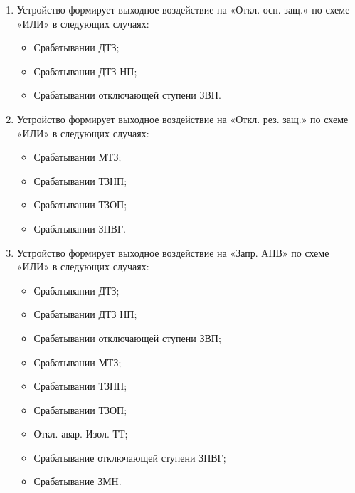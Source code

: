 \color{black}

\begin{enumerate}[label=\arabic{section}.\arabic{subsection}.\arabic{enumi}, labelsep=4pt, leftmargin=0pt, itemindent=57pt, itemsep=0pt, parsep=0pt] %


\item
Устройство формирует выходное воздействие на  «Откл. осн. защ.» по схеме «ИЛИ» в следующих 
случаях: 

\begin{itemize}
    \item Срабатывании ДТЗ;  
    \item Срабатывании ДТЗ НП;
    \item Срабатывании отключающей ступени ЗВП. 
\end{itemize}

\item
Устройство формирует выходное воздействие на  «Откл. рез. защ.» по схеме «ИЛИ» в следующих 
случаях: 

\begin{itemize}
    \item Срабатывании МТЗ; 
    \item Срабатывании ТЗНП; 
    \item Срабатывании ТЗОП;
    \item Срабатывании ЗПВГ.
\end{itemize}

\item
Устройство формирует выходное воздействие на «Запр. АПВ» по схеме «ИЛИ» в следующих 
случаях: 

\begin{itemize}
    \item Срабатывании ДТЗ;
    \item Срабатывании ДТЗ НП; 
    \item Срабатывании отключающей ступени ЗВП;
    \item Срабатывании МТЗ;
    \item Срабатывании ТЗНП;
    \item Срабатывании ТЗОП;
    \item Откл. авар. Изол. ТТ;
    \item Срабатывание отключающей ступени ЗПВГ; 
    \item Срабатывание ЗМН. 
\end{itemize}


\end{enumerate}
